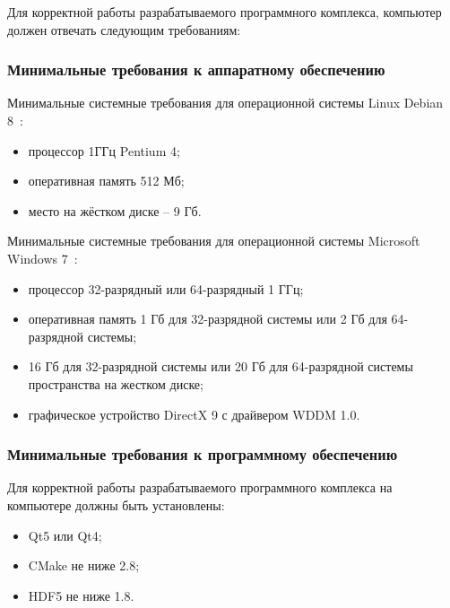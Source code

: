 Для корректной работы разрабатываемого программного комплекса, компьютер должен отвечать следующим требованиям:
\subsubsection {Минимальные требования к аппаратному обеспечению}
Минимальные системные требования для операционной системы Linux Debian 8~\cite{debian_8}:

\begin{itemize}
\item процессор 1ГГц Pentium 4;
\item оперативная память 512 Мб;
\item место на жёстком диске -- 9 Гб.
\end{itemize}

Минимальные системные требования для операционной системы Microsoft Windows 7~\cite{windows_7}:

\begin{itemize}
\item процессор 32-разрядный или 64-разрядный 1 ГГц;
\item оперативная память 1 Гб для 32-разрядной системы или 2 Гб для 64-разрядной системы;
\item 16 Гб для 32-разрядной системы или 20 Гб для 64-разрядной системы пространства на жестком диске;
\item графическое устройство DirectX 9 с драйвером WDDM 1.0.

\end{itemize}

\subsubsection {Минимальные требования к программному обеспечению}
Для корректной работы разрабатываемого программного комплекса на компьютере должны быть установлены:
\begin{itemize}
\item Qt5 или Qt4;
\item CMake не ниже 2.8;
\item HDF5 не ниже 1.8.
\end{itemize}